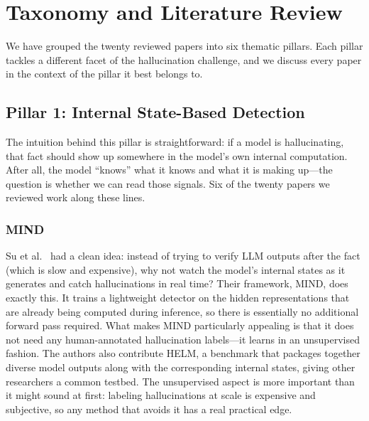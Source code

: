 \documentclass[journal]{IEEEtran}
\begin{document}
\section{Taxonomy and Literature Review}

We have grouped the twenty reviewed papers into six thematic pillars. Each pillar tackles a different facet of the hallucination challenge, and we discuss every paper in the context of the pillar it best belongs to.

\subsection{Pillar 1: Internal State-Based Detection}

The intuition behind this pillar is straightforward: if a model is hallucinating, that fact should show up somewhere in the model's own internal computation. After all, the model ``knows'' what it knows and what it is making up---the question is whether we can read those signals. Six of the twenty papers we reviewed work along these lines.

\subsubsection{MIND}
Su et al.~\cite{mind} had a clean idea: instead of trying to verify LLM outputs after the fact (which is slow and expensive), why not watch the model's internal states as it generates and catch hallucinations in real time? Their framework, MIND, does exactly this. It trains a lightweight detector on the hidden representations that are already being computed during inference, so there is essentially no additional forward pass required. What makes MIND particularly appealing is that it does not need any human-annotated hallucination labels---it learns in an unsupervised fashion. The authors also contribute HELM, a benchmark that packages together diverse model outputs along with the corresponding internal states, giving other researchers a common testbed. The unsupervised aspect is more important than it might sound at first: labeling hallucinations at scale is expensive and subjective, so any method that avoids it has a real practical edge.
\end{document}
